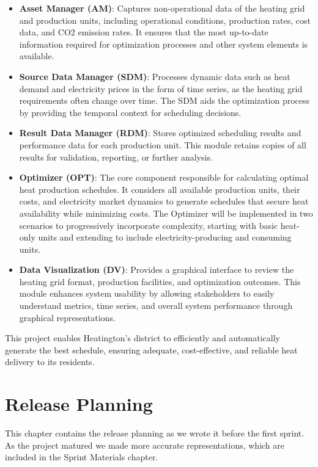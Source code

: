 \documentclass[12pt]{report}
\begin{document}
\begin{itemize}
    \item \textbf{Asset Manager (AM)}: Captures non-operational data of the heating grid and production units, including operational conditions, production rates, cost data, and CO2 emission rates. It ensures that the most up-to-date information required for optimization processes and other system elements is available.
    \item \textbf{Source Data Manager (SDM)}: Processes dynamic data such as heat demand and electricity prices in the form of time series, as the heating grid requirements often change over time. The SDM aids the optimization process by providing the temporal context for scheduling decisions.
    \item \textbf{Result Data Manager (RDM)}: Stores optimized scheduling results and performance data for each production unit. This module retains copies of all results for validation, reporting, or further analysis.
    \item \textbf{Optimizer (OPT)}: The core component responsible for calculating optimal heat production schedules. It considers all available production units, their costs, and electricity market dynamics to generate schedules that secure heat availability while minimizing costs. The Optimizer will be implemented in two scenarios to progressively incorporate complexity, starting with basic heat-only units and extending to include electricity-producing and consuming units.
    \item \textbf{Data Visualization (DV)}: Provides a graphical interface to review the heating grid format, production facilities, and optimization outcomes. This module enhances system usability by allowing stakeholders to easily understand metrics, time series, and overall system performance through graphical representations.
\end{itemize}

This project enables Heatington’s district to efficiently and automatically generate the best schedule, ensuring adequate, cost-effective, and reliable heat delivery to its residents.

\chapter{Release Planning}
This chapter contains the release planning as we wrote it before the first sprint. As the project matured we made more accurate representations, which are included in the Sprint Materials chapter.
\end{document}
